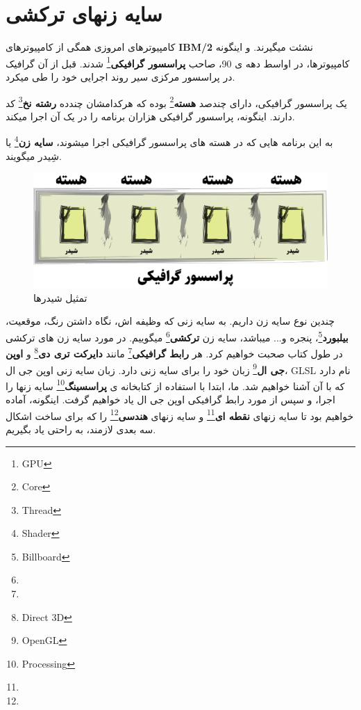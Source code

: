 \documentclass[14pt,a4paper]{memoir}
\begin{document}
	 
	 
	 
	 
\section{سایه زنهای ترکشی}\label{frag}

	 
	 
	 کامپیوترهای امروزی همگی از کامپیوترهای \textbf{IBM/2} نشئت میگیرند. و اینگونه کامپیوترها، در اواسط دهه ی 90، صاحب \textbf{پراسسور گرافیکی}\footnote{GPU} شدند. قبل از آن گرافیک در پراسسور مرکزی سیر روند اجرایی خود را طی میکرد. 
	 
	 
	 یک پراسسور گرافیکی، دارای چندصد \textbf{هسته}\footnote{Core} بوده که هرکدامشان چندده \textbf{رشته نخ}\footnote{Thread} کد دارند. اینگونه، پراسسور گرافیکی هزاران برنامه را در یک آن اجرا میکند.
	 
	 به این برنامه هایی که در هسته های پراسسور گرافیکی اجرا میشوند، \textbf{سایه زن}\footnote{Shader} یا شِیدر میگویند. 
	 
	 
	 
	 \begin{figure}[H]
	 	\centering
	 	\includegraphics[scale=1]{Shaders}
	 	\caption{تمثیل شیدرها}
	 \end{figure}
	 
	 
	 چندین نوع سایه زن داریم. به سایه زنی که وظیفه اش، نگاه داشتن رنگ، موقعیت، \textbf{بیلبورد}\footnote{Billboard}، پنجره و... میباشد، سایه زن \textbf{ترکشی}\footnote{} میگوییم. در مورد سایه زن های ترکشی در طول کتاب صحبت خواهیم کرد. هر \textbf{رابط گرافیکی}\footnote{} مانند \textbf{دایرکت تری دی}\footnote{Direct 3D} و \textbf{اوپن جی ال}\footnote{OpenGL} زبان خود را برای سایه زنی دارد. زبان سایه زنی اوپن جی ال، GLSL نام دارد که با آن آشنا خواهیم شد. ما، ابتدا با استفاده از کتابخانه ی \textbf{پراسسینگ}\footnote{Processing} سایه زنها را اجرا، و سپس از مورد رابط گرافیکی اوپن جی ال یاد خواهیم گرفت. اینگونه، آماده خواهیم بود تا سایه زنهای \textbf{نقطه ای}\footnote{} و سایه زنهای \textbf{هندسی}\footnote{} را که برای ساخت اشکال سه بعدی لازمند، به راحتی یاد بگیریم.
	 
\end{document}
